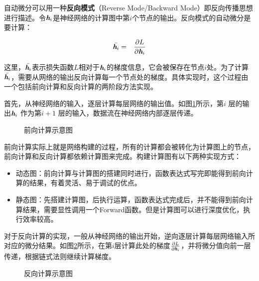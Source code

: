 \parinterval  自动微分可以用一种{\small\sffamily\bfseries{反向模式}}（Reverse Mode/Backward Mode）即反向传播思想进行描述。令${\textbf{\em h}}_i$是神经网络的计算图中第$i$个节点的输出。反向模式的自动微分是要计算：

\begin{eqnarray}
\bar{{\textbf{\em h}}_i} &=& \frac{\partial L}{\partial {\textbf{\em h}}_i} \label{eq:reverse-mode-v}
\end{eqnarray}

\noindent 这里，$\bar{{\textbf{\em h}}_i}$表示损失函数$L$相对于${\textbf{\em h}}_i$的梯度信息，它会被保存在节点$i$处。为了计算$\bar{{\textbf{\em h}}_i}$，需要从网络的输出反向计算每一个节点处的梯度。具体实现时，这个过程由一个包括前向计算和反向计算的两阶段方法实现。

\parinterval 首先，从神经网络的输入，逐层计算每层网络的输出值。如图\ref{fig:9-44}所示，第$ i $ 层的输出$ {\textbf{\em h}}_i $ 作为第$ i+1 $ 层的输入，数据流在神经网络内部逐层传递。

\begin{figure}[htp]
\centering

\caption{前向计算示意图}
\label{fig:9-44}
\end{figure}

\parinterval  前向计算实际上就是网络构建的过程，所有的计算都会被转化为计算图上的节点，前向计算和反向计算都依赖计算图来完成。构建计算图有以下两种实现方式：

\begin{itemize}
\vspace{0.5em}
\item 动态图：前向计算与计算图的搭建同时进行，函数表达式写完即能得到前向计算的结果，有着灵活、易于调试的优点。
\vspace{0.5em}
\item 静态图：先搭建计算图，后执行运算，函数表达式完成后，并不能得到前向计算结果，需要显性调用一个Forward函数。但是计算图可以进行深度优化，执行效率较高。
\vspace{0.5em}
\end{itemize}

\parinterval  对于反向计算的实现，一般从神经网络的输出开始，逆向逐层计算每层网络输入所对应的微分结果。如图\ref{fig:9-45}所示，在第$ i $层计算此处的梯度$ \frac{\partial L}{\partial {\textbf{\em h}}_i} $，并将微分值向前一层传递，根据链式法则继续计算梯度。

\begin{figure}[htp]
\centering

\caption{反向计算示意图}
\label{fig:9-45}
\end{figure}

